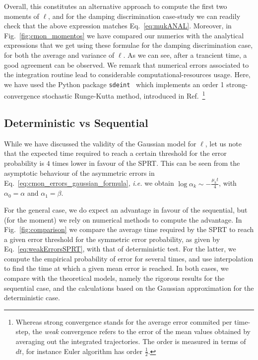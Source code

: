 Overall, this constitutes an alternative approach to compute the first two moments of $\ell$, and for the damping discrimination case-study we can readily check that the above expression matches Eq.~\ref{eq:mukANAL}. Moreover, in Fig.~\ref{fig:cmon_momentos} we have compared our numerics with the analytical expressions that we get using these formulae for the damping discrimination case, for both the average and variance of $\ell$. As we can see, after a trancient time, a good agreement can be observed. We remark that numerical errors associated to the integration routine lead to considerable computational-resources usage. Here, we have used the Python package \texttt{sdeint}~\cite{sdeint} which implements an order 1 strong-convergence stochastic Runge-Kutta method, introduced in Ref.~\cite{robler}\footnote{Whereas strong convergence stands for the average error commited per time-step, the \textit{weak} convergence refers to the error of the mean values obtained by averaging out the integrated trajectories. The order is measured in terms of $dt$, for instance Euler algorithm has order $\frac{1}{2}$.}




\subsection{Deterministic vs Sequential}
While we have discussed the validity of the Gaussian model for $\ell$, let us note that the expected time required to reach a certain threshold for the error probability is $4$ times lower in favour of the SPRT. This can be seen from the asymptotic behaviour of the asymmetric errors in Eq.~\ref{eq:cmon_errors_gaussian_formula}, \textit{i.e.} we obtain $\log{\alpha_k}\sim-\frac{\mu_k t}{4}$, with $\alpha_0 = \alpha$ and $\alpha_1 = \beta$.

For the general case, we do expect an advantage in favour of the sequential, but (for the moment) we rely on numerical methods to compute the advantage. In Fig.~\ref{fig:comparison} we compare the average time required by the SPRT to reach a given error threshold for the symmetric error probability, as given by Eq.~\ref{eq:weakErrorsSPRT}, with that of deterministic test. For the latter, we compute the empirical probability of error for several times, and use interpolation to find the time at which a given mean error is reached. In both cases, we compare with the theoretical models, namely the rigorous results for the sequential case, and the calculations based on the Gaussian approximation for the deterministic case.

